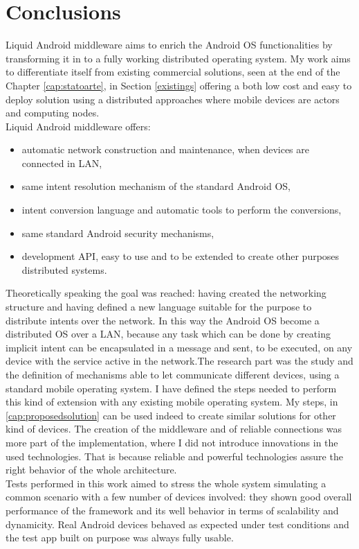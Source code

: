 \section{Conclusions}
Liquid Android middleware aims to enrich the Android OS functionalities by transforming it in to a fully working distributed operating system. My work aims to differentiate itself from existing commercial solutions, seen at the end of the Chapter \ref{cap:statoarte}, in Section \ref{existings} offering a both low cost and easy to deploy solution using a distributed approaches where mobile devices are actors and computing nodes.\\
Liquid Android middleware offers:
\begin{itemize}
	\item automatic network construction and maintenance, when devices are connected in LAN,
	\item same intent resolution mechanism of the standard Android OS,
	\item intent conversion language and automatic tools to perform the conversions,
	\item same standard Android security mechanisms,
	\item development API, easy to use and to be extended to create other purposes distributed systems.
\end{itemize}
Theoretically speaking the goal was reached: having created the networking structure and having defined a new language suitable for the purpose to distribute intents over the network. In this way the Android OS become a distributed OS over a LAN, because any task which can be done by creating implicit intent can be encapsulated in a message and sent, to be executed, on any device with the service active in the network.The research part
was the study and the definition of mechanisms able to let communicate different devices, using a standard mobile operating system. I have defined the steps needed to perform this kind of extension with any existing mobile operating system. My steps, in \ref{cap:proposedsolution} can be used indeed to create similar solutions for other kind of devices. The creation of the middleware and of reliable connections was more part of the implementation, where I did not introduce innovations in the used technologies. That is because reliable and powerful technologies assure the right behavior of the whole architecture.\\
Tests performed in this work aimed to stress the whole system simulating a common scenario with a few number of devices involved: they shown good overall performance of the framework and its well behavior in terms of scalability and dynamicity. Real Android devices behaved as expected under test conditions and the test app built on purpose was always fully usable.\\
